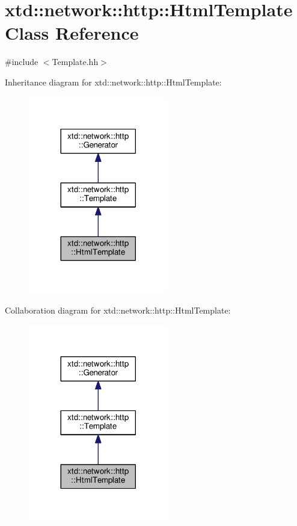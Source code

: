 \hypertarget{classxtd_1_1network_1_1http_1_1HtmlTemplate}{}\section{xtd\+:\+:network\+:\+:http\+:\+:Html\+Template Class Reference}
\label{classxtd_1_1network_1_1http_1_1HtmlTemplate}


{\ttfamily \#include $<$Template.\+hh$>$}



Inheritance diagram for xtd\+:\+:network\+:\+:http\+:\+:Html\+Template\+:
\nopagebreak
\begin{figure}[H]
\begin{center}
\leavevmode
\includegraphics[width=173pt]{classxtd_1_1network_1_1http_1_1HtmlTemplate__inherit__graph}
\end{center}
\end{figure}


Collaboration diagram for xtd\+:\+:network\+:\+:http\+:\+:Html\+Template\+:
\nopagebreak
\begin{figure}[H]
\begin{center}
\leavevmode
\includegraphics[width=173pt]{classxtd_1_1network_1_1http_1_1HtmlTemplate__coll__graph}
\end{center}
\end{figure}
